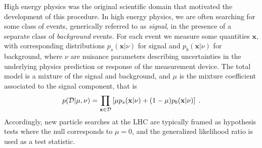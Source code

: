 \documentclass[12pt]{article}
\numberwithin{equation}{section}
\theoremstyle{plain}
\begin{document}
High energy physics was the original scientific domain that motivated the development of this procedure.
In high energy physics, we are often searching for some class of events,
generically referred to as \textit{signal}, in the presence of a separate class
of \textit{background} events.  For each event we measure some quantities
$\mathbf{x}$, with corresponding distributions $p_s(\mathbf{x}|\nu)$ for signal
and $p_b(\mathbf{x}|\nu)$ for background,  where $\nu$ are nuisance
parameters describing uncertainties in the underlying physics prediction or
response of the measurement device. The total model is a mixture of the signal
and background, and $\mu$ is the mixture coefficient associated to the signal
component, that is
\begin{equation}\label{eq:hepGen}
p( {\cal D} | \mu, \nu) = \prod_{\mathbf{x} \in {\cal D}} \left[ \mu p_s( \mathbf{x} |  \nu)  + (1-\mu) p_b( \mathbf{x} | \nu) \right] \;.
\end{equation}
Accordingly, new particle searches at the LHC are typically framed as
hypothesis tests where the null corresponds to $\mu=0$, and the generalized
likelihood ratio is used as a test statistic.

\end{document}
